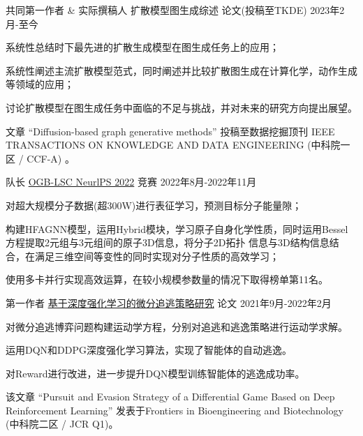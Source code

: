 \begin{cventries}
\cventry
{共同第一作者 \& 实际撰稿人} %
{扩散模型图生成综述} %
{论文(投稿至TKDE)} %
{2023年2月-至今} %
{
  \begin{cvitems} 
    \item {系统性总结时下最先进的扩散生成模型在图生成任务上的应用；}
    \item {系统性阐述主流扩散模型范式，同时阐述并比较扩散图生成在计算化学，动作生成等领域的应用；}
    \item {讨论扩散模型在图生成任务中面临的不足与挑战，并对未来的研究方向提出展望。}
    \item {文章 “Diffusion-based graph generative methods” 投稿至数据挖掘顶刊 IEEE TRANSACTIONS ON KNOWLEDGE AND DATA ENGINEERING (中科院一区 / CCF-A) 。}
\end{cvitems}
}

\cventry
{队长} %
{\href{https://ogb.stanford.edu/neurips2022/results/}{OGB-LSC NeurlPS 2022}} %
{竞赛} %
{2022年8月-2022年11月} %
{
  \begin{cvitems} %
    \item {对超大规模分子数据(超300W)进行表征学习，预测目标分子能量隙；}
    \item {构建HFAGNN模型，运用Hybrid模块，学习原子自身化学性质，同时运用Bessel方程提取2元组与3元组间的原子3D信息，将分子2D拓扑
    信息与3D结构信息结合，在满足三维空间等变性的同时实现对分子性质的高效学习；}
    \item {使用多卡并行实现高效运算，在较小规模参数量的情况下取得榜单第11名。}
  \end{cvitems}
}

\cventry
{第一作者} %
{\href{https://www.frontiersin.org/articles/10.3389/fbioe.2022.827408/full}{基于深度强化学习的微分追逃策略研究}} %
{论文} %
{2021年9月-2022年2月} %
{
  \begin{cvitems} %
    \item {对微分追逃博弈问题构建运动学方程，分别对追逃和逃逸策略进行运动学求解。}
    \item {运用DQN和DDPG深度强化学习算法，实现了智能体的自动逃逸。}
    \item {对Reward进行改进，进一步提升DQN模型训练智能体的逃逸成功率。}
    \item {该文章 “Pursuit and Evasion Strategy of a Differential Game Based on Deep Reinforcement Learning” 发表于Frontiers in Bioengineering and Biotechnology (中科院二区 / JCR Q1)。}
  \end{cvitems}
}


\end{cventries}

